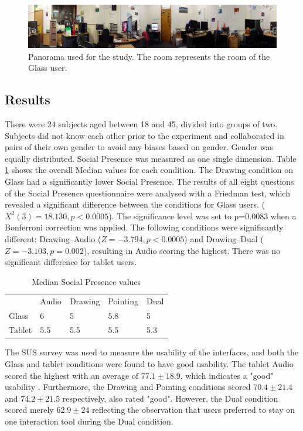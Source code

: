 \begin{figure}[ht]
	\centering
	\includegraphics[width=\linewidth]{images/ismar14/envrionment-setup}
	\caption{Panorama used for the study. The room represents the room of the Glass user.}
	\label{fig:ismar14:envrionment-setup}
\end{figure}

\subsection{Results}

There were 24 subjects aged between 18 and 45, divided into groups of two. Subjects did not know each other prior to the experiment and collaborated in pairs of their own gender to avoid any biases based on gender. Gender was equally distributed. Social Presence was measured as one single dimension. Table \ref{tbl:ismar14-results} shows the overall Median values for each condition. The Drawing condition on Glass had a significantly lower Social Presence. The results of all eight questions of the Social Presence questionnaire were analysed with a Friedman test, which revealed a significant difference between the conditions for Glass users. ($X^2(3)=18.130, p<0.0005$). The significance level was set to p=0.0083 when a Bonferroni correction was applied. The following conditions were significantly different: Drawing–Audio ($Z=-3.794, p<0.0005$) and Drawing–Dual ($Z=-3.103, p=0.002$), resulting in Audio scoring the highest. There was no significant difference for tablet users.

\begin{table}[]
    \centering
    \begin{tabular}{lllll}
           & Audio & Drawing & Pointing & Dual \\
    Glass  & 6     & 5       & 5.8      & 5    \\
    Tablet & 5.5   & 5.5     & 5.5      & 5.3 
    \end{tabular}
    \caption{Median Social Presence values}
    \label{tbl:ismar14-results}
\end{table}

The SUS survey was used to measure the usability of the interfaces, and both the Glass and tablet conditions were found to have good usability. The tablet Audio scored the highest with an average of $77.1\pm18.9$, which indicates a "good" usability \cite{Bangor2008}. Furthermore, the Drawing and Pointing conditions scored $70.4\pm21.4$ and $74.2\pm21.5$ respectively, also rated "good". However, the Dual condition scored merely $62.9\pm24$ reflecting the observation that users preferred to stay on one interaction tool during the Dual condition.

